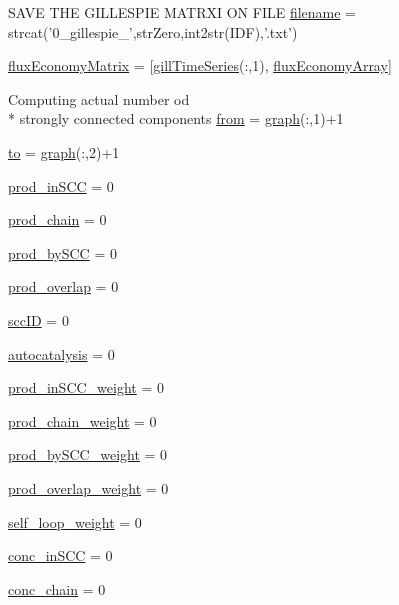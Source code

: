 \begin{DoxyCompactItemize}
\item 
S\+A\+V\+E T\+H\+E G\+I\+L\+L\+E\+S\+P\+I\+E M\+A\+T\+R\+X\+I O\+N F\+I\+L\+E \hyperlink{a00028_a3982f974d3baf0c73223616526999bed}{filename} = strcat('0\+\_\+gillespie\+\_\+',str\+Zero,int2str(\+I\+D\+F),'.\+txt')
\item 
\hyperlink{a00028_a0f649e90f057db90356bf42a61b618b3}{flux\+Economy\+Matrix} = \mbox{[}\hyperlink{a00028_ac62d9b6e4b7257c90322e20e1eb8e733}{gill\+Time\+Series}(\+:,1), \hyperlink{a00028_a5d3cba9db002e77eaf6ffce66592841f}{flux\+Economy\+Array}\mbox{]}
\item 
Computing actual number od \\*
strongly connected components \hyperlink{a00028_aa7b4fe13e75a69fca72862effeaf6196}{from} = \hyperlink{a00028_a2745e24fec2a44d51f4452beb1596bd3}{graph}(\+:,1)+1
\item 
\hyperlink{a00028_af71dbe52628a3f83a77ab494817525c6}{to} = \hyperlink{a00028_a2745e24fec2a44d51f4452beb1596bd3}{graph}(\+:,2)+1
\item 
\hyperlink{a00028_a4af96d327ccc28de3433ec07f61e2617}{prod\+\_\+in\+S\+C\+C} = 0
\item 
\hyperlink{a00028_ae0bd6421b7c81047a5234aeeb707efc4}{prod\+\_\+chain} = 0
\item 
\hyperlink{a00028_a9c39bd233d632a4392a969b0ba0ac2bd}{prod\+\_\+by\+S\+C\+C} = 0
\item 
\hyperlink{a00028_a0aa4c3fee8d2729e5b7aa511a3100685}{prod\+\_\+overlap} = 0
\item 
\hyperlink{a00028_a85ff953f350ff6660d5f3489e31d57b6}{scc\+I\+D} = 0
\item 
\hyperlink{a00028_a2d0b5f62c8a18e8cbfeb15c6f8856c5a}{autocatalysis} = 0
\item 
\hyperlink{a00028_aeb0c708cea53f4ecbc2e1a8fad331f3b}{prod\+\_\+in\+S\+C\+C\+\_\+weight} = 0
\item 
\hyperlink{a00028_a0924b7317732c12de281bee31879470d}{prod\+\_\+chain\+\_\+weight} = 0
\item 
\hyperlink{a00028_aac9f4f22f537f0fc5fd69163676333af}{prod\+\_\+by\+S\+C\+C\+\_\+weight} = 0
\item 
\hyperlink{a00028_a75fbcaf1e595fc3264e0cba051e4ba02}{prod\+\_\+overlap\+\_\+weight} = 0
\item 
\hyperlink{a00028_a8c1a84735122e25dcd5f68a0bf4c312b}{self\+\_\+loop\+\_\+weight} = 0
\item 
\hyperlink{a00028_a2ac2f79c8327273bba427ba3e8d2cfbe}{conc\+\_\+in\+S\+C\+C} = 0
\item 
\hyperlink{a00028_a0c333384119ea83494f4b4310ac18eea}{conc\+\_\+chain} = 0

\end{DoxyCompactItemize}
